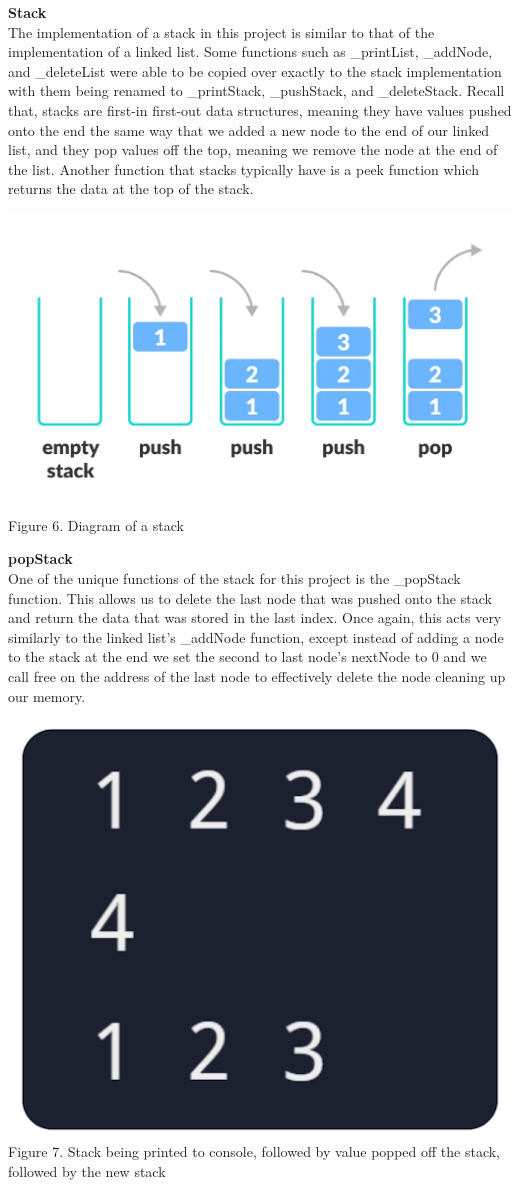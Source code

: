 \documentclass[twoside]{article}
\begin{document}
\noindent \textbf{\Large Stack} \\
\noindent The implementation of a stack in this project is similar to that of the implementation of a linked list. Some functions such as \_printList, \_addNode, and \_deleteList were able to be copied over exactly to the stack implementation with them being renamed to \_printStack, \_pushStack, and \_deleteStack. Recall that, stacks are first-in first-out data structures, meaning they have values pushed onto the end the same way that we added a new node to the end of our linked list, and they pop values off the top, meaning we remove the node at the end of the list. Another function that stacks typically have is a peek function which returns the data at the top of the stack.
\begin{center}
    \includegraphics[width=.65\textwidth]{images/stackDiagram.png}\\
    Figure 6. Diagram of a stack
\end{center}

\noindent \textbf{\large popStack} \\
\noindent One of the unique functions of the stack for this project is the \_popStack function. This allows us to delete the last node that was pushed onto the stack and return the data that was stored in the last index. Once again, this acts very similarly to the linked list’s \_addNode function, except instead of adding a node to the stack at the end we set the second to last node’s nextNode to 0 and we call free on the address of the last node to effectively delete the node cleaning up our memory.
\begin{center}
    \includegraphics[width=.35\textwidth]{images/stackOutput.png}\\
    Figure 7. Stack being printed to console, followed by value popped off the stack, followed by the new stack
\end{center}
\end{document}
